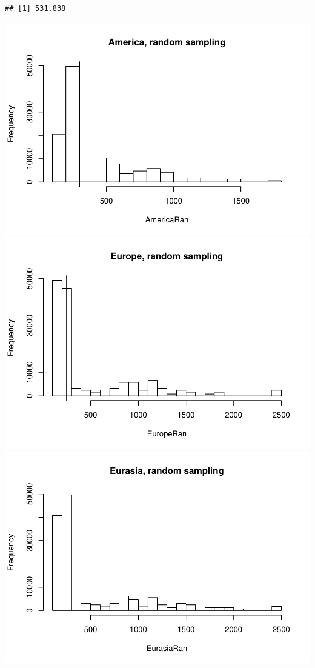 \documentclass[]{article}
\begin{document}
\begin{verbatim}
## [1] 531.838
\end{verbatim}

\includegraphics{MA_JJ_files/figure-latex/RSCon-1.pdf}
\includegraphics{MA_JJ_files/figure-latex/RSCon-2.pdf}
\includegraphics{MA_JJ_files/figure-latex/RSCon-3.pdf}
\end{document}
